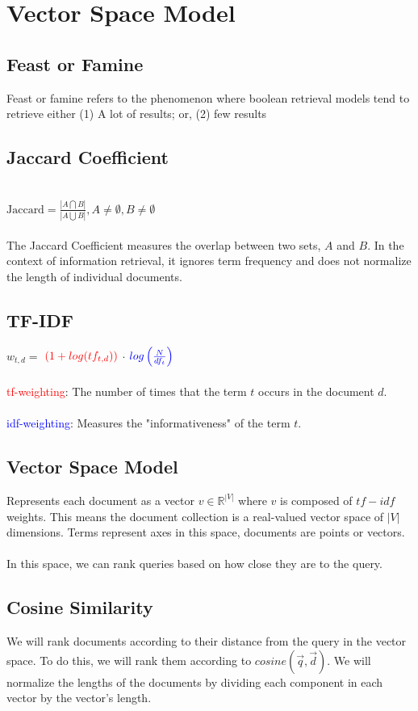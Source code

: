 \documentclass{article}%
\begin{document}
\section*{Vector Space Model}
\subsection*{Feast or Famine}
Feast or famine refers to the phenomenon where boolean retrieval models tend to retrieve either (1) A lot of results; or, (2) few results
\subsection*{Jaccard Coefficient}\\


$\textrm{Jaccard} = \frac{|A \bigcap B|}{|A \bigcup B|}, A \neq \emptyset , B \neq \emptyset$\\
\\
The Jaccard Coefficient measures the overlap between two sets, $A$ and $B$. In the context of information retrieval, it ignores term frequency
and does not normalize the length of individual documents.
\subsection*{TF-IDF}
$w_{t,d} = $
$\color{red} (1 + log(tf_{t,d}))$
$\cdot$
$\color{blue} log \left( \frac{N}{df_t} \right)$\\
\\
\textcolor{red}{tf-weighting}: The number of times that the term $t$ occurs in the document $d$.\\
\\
\textcolor{blue}{idf-weighting}: Measures the "informativeness" of the term $t$.

\subsection*{Vector Space Model}
Represents each document as a vector $v \in \mathbb{R}^{|V|}$ where $v$ is composed of $tf-idf$ weights. This means the document collection
is a real-valued vector space of $|V|$ dimensions. Terms represent axes in this space, documents are points or vectors.\\
\\
In this space, we can rank queries based on how close they are to the query.
\subsection*{Cosine Similarity}
We will rank documents according to their distance from the query in the vector space. To do this, we will rank them according to
$cosine(\vec{q}, \vec{d})$. We will normalize the lengths of the documents by dividing each component in each vector by the vector's
length.\\
\end{document}

